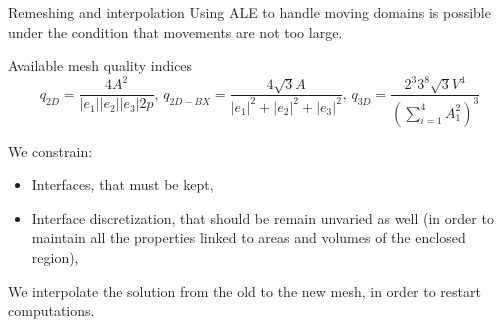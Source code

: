 \documentclass{beamer}
\begin{document}
	\begin{frame}{Remeshing and interpolation}		
		Using ALE to handle moving domains is possible under the condition that movements are not too large.
		\begin{alertblock}{Available mesh quality indices}
			\begin{equation*}
				q_{2D} = \frac{4A^2}{|e_1||e_2||e_3|2p}, \, q_{2D-BX} = \frac{4\sqrt{3}A}{|e_1|^2+|e_2|^2+|e_3|^2}, \, q_{3D} = \frac{2^3 3^8 \sqrt{3}V^4}{(\sum_{i=1}^{4} A_1^2)^3}
			\end{equation*}	
		\end{alertblock}
		We constrain:
		\begin{itemize}
			\item Interfaces, that must be kept,
			\item Interface discretization, that should be remain unvaried as well (in order to maintain all the properties linked to areas and volumes of the enclosed region),
			\end{itemize}
			We interpolate the solution from the old to the new mesh, in order to restart computations.
	\end{frame}
\end{document}
